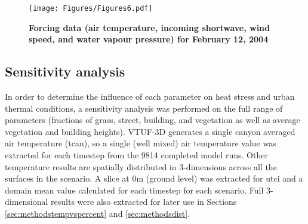 \documentclass[final,3p,times,authoryear]{elsarticle}
\begin{document}
\begin{figure}
\centering
\texttt{[image: Figures/Figures6.pdf]}
\caption{\bf Forcing data (air temperature, incoming shortwave, wind speed, and water vapour pressure) for February 12, 2004}
 \label{fig:forcing}
\end{figure} 

\subsection{Sensitivity analysis}\label{sec:methodsparam}




In order to determine the influence of each parameter on heat stress and urban thermal conditions, a sensitivity analysis was performed on the full range of parameters (fractions of grass, street, building, and vegetation as well as average vegetation and building heights). VTUF-3D generates a single canyon averaged air temperature (\gls{tcan}), so a single (well mixed) air temperature value was extracted for each timestep from the 9814 completed model runs. Other temperature results are spatially distributed in 3-dimensions across all the surfaces in the scenario. A slice at 0m (ground level) was extracted for \gls{utci} and a domain mean value calculated for each timestep for each scenario. Full 3-dimensional results were also extracted for later use in Sections \ref{sec:methodstempvspercent} and \ref{sec:methodsdist}.
\end{document}
